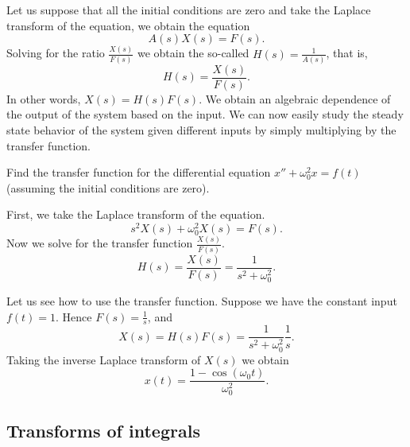 \documentclass{ximera}
\begin{document}
Let us suppose that all the initial conditions are zero and take the Laplace transform of the equation, we obtain the equation
\begin{equation*}
    A(s) X(s) = F(s) .
\end{equation*}
Solving for the ratio $\frac{X(s)}{F(s)}$ we obtain the so-called \emph{} $H(s) = \frac{1}{A(s)}$, that is,
\begin{equation*}
    H(s) = \frac{X(s)}{F(s)} .
\end{equation*}
In other words, $X(s) = H(s) F(s)$.  We obtain an algebraic dependence of the output of the system based on the input.  We can now easily study the steady state behavior of the system given different inputs by simply multiplying by the transfer function.

\begin{example}
    Find the transfer function for the differential equation $x'' + \omega_0^2 x = f(t)$ (assuming the initial conditions are zero).
\end{example}

\begin{exampleSol}
    First, we take the Laplace transform of the equation.
    \begin{equation*}
        s^2 X(s) + \omega_0^2 X(s) = F(s) .
    \end{equation*}
    Now we solve for the transfer function $\frac{X(s)}{F(s)}$.
    \begin{equation*}
        H(s) = \frac{X(s)}{F(s)} = \frac{1}{s^2 + \omega_0^2} .
    \end{equation*}
    
    Let us see how to use the transfer function.  Suppose we have the constant input $f(t) = 1$.  Hence $F(s) = \frac{1}{s}$, and
    \begin{equation*}
        X(s) = H(s) F(s) = \frac{1}{s^2+\omega_0^2} \frac{1}{s} .
    \end{equation*}
    Taking the inverse Laplace transform of $X(s)$ we obtain
    \begin{equation*}
        x(t) = \frac{1-\cos(\omega_0 t)}{\omega_0^2} .
    \end{equation*}
\end{exampleSol}

\subsection{Transforms of integrals}
\end{document}
